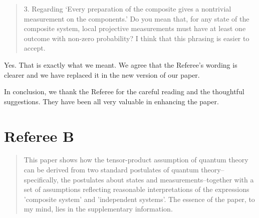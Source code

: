 \documentclass[11pt]{article}
\begin{document}
\begin{quote}
3. Regarding `Every preparation of the composite gives a
nontrivial measurement on the components.' Do you mean that, for any
state of the composite system, local projective measurements must have
at least one outcome with non-zero probability? I think that this
phrasing is easier to accept.
\end{quote}
Yes. That is exactly what we meant. We agree that the Referee's
wording is clearer and we have replaced it in the new version of our
paper. 

In conclusion, we thank the Referee for the careful reading and the
thoughtful suggestions. They have been all very valuable in enhancing
the paper.

\section*{Referee B}

\begin{quote}
This paper shows how the tensor-product assumption of
quantum theory can be derived from two standard postulates of quantum
theory--specifically, the postulates about states and
measurements--together with a set of assumptions reflecting reasonable
interpretations of the expressions 'composite system' and 'independent
systems'. The essence of the paper, to my mind, lies in the
supplementary information.
\end{quote}
\end{document}

